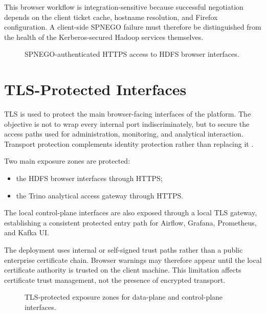 This browser workflow is integration-sensitive because successful negotiation depends on the client ticket cache, hostname resolution, and Firefox configuration. A client-side SPNEGO failure must therefore be distinguished from the health of the Kerberos-secured Hadoop services themselves.

\begin{figure}[H]
    \centering
    
    \caption{SPNEGO-authenticated HTTPS access to HDFS browser interfaces.}
    \label{fig:chapter7-hdfs-browser-spnego}
\end{figure}

\section{TLS-Protected Interfaces}
TLS is used to protect the main browser-facing interfaces of the platform. The objective is not to wrap every internal port indiscriminately, but to secure the access paths used for administration, monitoring, and analytical interaction. Transport protection complements identity protection rather than replacing it \cite{apache_hadoop_docs,trino_docs}.

Two main exposure zones are protected:
\begin{itemize}
    \item the HDFS browser interfaces through HTTPS;
    \item the Trino analytical access gateway through HTTPS.
\end{itemize}

The local control-plane interfaces are also exposed through a local TLS gateway, establishing a consistent protected entry path for Airflow, Grafana, Prometheus, and Kafka UI.

The deployment uses internal or self-signed trust paths rather than a public enterprise certificate chain. Browser warnings may therefore appear until the local certificate authority is trusted on the client machine. This limitation affects certificate trust management, not the presence of encrypted transport.

\begin{figure}[H]
    \centering
    
    \caption{TLS-protected exposure zones for data-plane and control-plane interfaces.}
    \label{fig:chapter7-tls-exposure-zones}
\end{figure}


